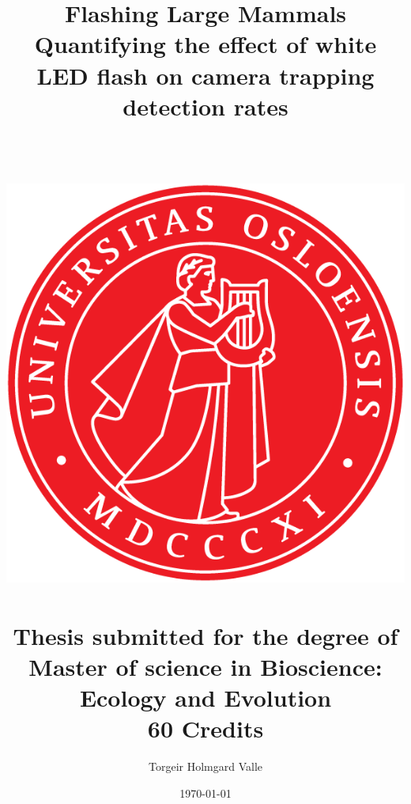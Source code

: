 \title{	
	{\huge Flashing Large Mammals}\\
	{Quantifying the effect of white LED flash on camera trapping detection rates}\\
	{~}\\
	{~}\\
	{\includegraphics[scale=0.3]{img/UiO_logo.png} }\\
	{~}\\
	{\large Thesis submitted for the degree of Master of science in Bioscience:\\
	Ecology and Evolution \\ 60 Credits}
}
\author{Torgeir Holmgard Valle}
\date{\today}